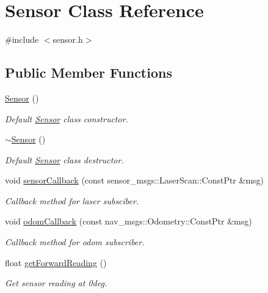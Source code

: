 \hypertarget{class_sensor}{}\section{Sensor Class Reference}
\label{class_sensor}


{\ttfamily \#include $<$sensor.\+h$>$}

\subsection*{Public Member Functions}
\begin{DoxyCompactItemize}
\item 
\mbox{\hyperlink{class_sensor_a342d6d11ef572c8cba92cb76fb1a294b}{Sensor}} ()
\begin{DoxyCompactList}\small\item\em Default \mbox{\hyperlink{class_sensor}{Sensor}} class constructor. \end{DoxyCompactList}\item 
\mbox{\hyperlink{class_sensor_aee8c70e7ef05ce65e7ee33686b5d7db2}{$\sim$\+Sensor}} ()
\begin{DoxyCompactList}\small\item\em Default \mbox{\hyperlink{class_sensor}{Sensor}} class destructor. \end{DoxyCompactList}\item 
void \mbox{\hyperlink{class_sensor_abc654feeb9c9b67efcda04b62072d828}{sensor\+Callback}} (const sensor\+\_\+msgs\+::\+Laser\+Scan\+::\+Const\+Ptr \&msg)
\begin{DoxyCompactList}\small\item\em Callback method for laser subsciber. \end{DoxyCompactList}\item 
void \mbox{\hyperlink{class_sensor_a69dc2c8fc57c2b421913fda9b1e19fbc}{odom\+Callback}} (const nav\+\_\+msgs\+::\+Odometry\+::\+Const\+Ptr \&msg)
\begin{DoxyCompactList}\small\item\em Callback method for odom subscriber. \end{DoxyCompactList}\item 
float \mbox{\hyperlink{class_sensor_a0cb8d226a7df00fa404c100f959868e6}{get\+Forward\+Reading}} ()
\begin{DoxyCompactList}\small\item\em Get sensor reading at 0deg. \end{DoxyCompactList}\item 

\end{DoxyCompactItemize}
